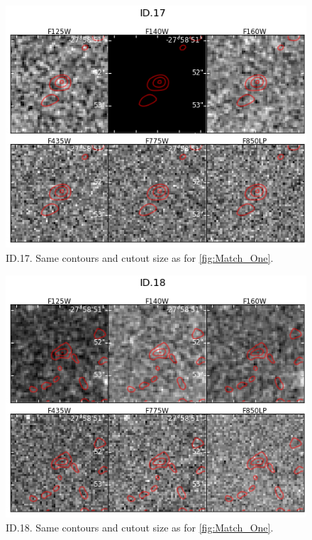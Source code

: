 \begin{figure}[tbp]
\centering \includegraphics[width=160mm]{Matched/ASPECS_Cutout_16.jpg}
\caption{ID.17. Same contours and cutout size as for \ref{fig:Match_One}.}
\label{fig:Match_Three}
\end{figure}

\begin{figure}[tbp]
\centering \includegraphics[width=160mm]{Matched/ASPECS_Cutout_17.jpg}
\caption{ID.18. Same contours and cutout size as for \ref{fig:Match_One}.}
\label{fig:Match_Three}
\end{figure}

